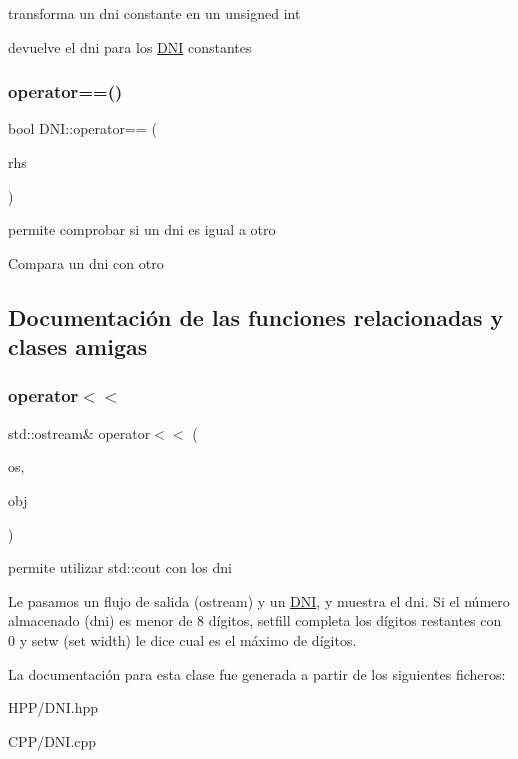 transforma un dni constante en un unsigned int 

devuelve el dni para los \hyperlink{classDNI}{D\+NI} constantes \mbox{\label{classDNI_ab2d1d81aa60a3463b88f6bf0b9ff7b8c}} 
\subsubsection{\texorpdfstring{operator==()}{operator==()}}
{\footnotesize\ttfamily bool D\+N\+I\+::operator== (\begin{DoxyParamCaption}\item[{const \hyperlink{classDNI}{D\+NI} \&}]{rhs }\end{DoxyParamCaption})}



permite comprobar si un dni es igual a otro 

Compara un dni con otro 

\subsection{Documentación de las funciones relacionadas y clases amigas}
\mbox{\label{classDNI_af9c196ae0bace5ca99b1dc9c16a069da}} 
\subsubsection{\texorpdfstring{operator$<$$<$}{operator<<}}
{\footnotesize\ttfamily std\+::ostream\& operator$<$$<$ (\begin{DoxyParamCaption}\item[{std\+::ostream \&}]{os,  }\item[{const \hyperlink{classDNI}{D\+NI} \&}]{obj }\end{DoxyParamCaption})\hspace{0.3cm}{\ttfamily [friend]}}



permite utilizar std\+::cout con los dni 

Le pasamos un flujo de salida (ostream) y un \hyperlink{classDNI}{D\+NI}, y muestra el dni. Si el número almacenado (dni) es menor de 8 dígitos, setfill completa los dígitos restantes con \textquotesingle{}0\textquotesingle{} y setw (set width) le dice cual es el máximo de dígitos. 

La documentación para esta clase fue generada a partir de los siguientes ficheros\+:\begin{DoxyCompactItemize}
\item 
H\+P\+P/D\+N\+I.\+hpp\item 
C\+P\+P/D\+N\+I.\+cpp\end{DoxyCompactItemize}
